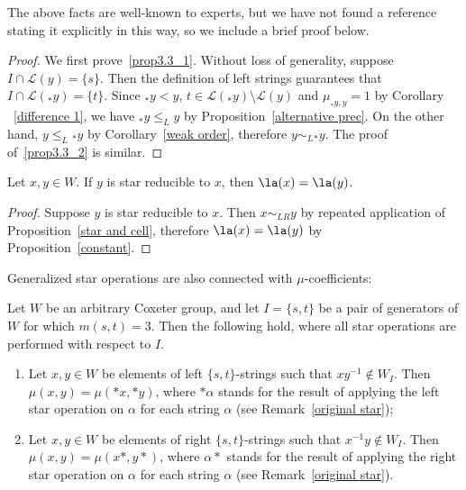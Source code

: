  \begin{rema}
 The above facts are well-known to experts, but we have
 not found a reference stating it explicitly in this way, so we include a
 brief proof below. 
 \end{rema}
 \begin{proof}
 We first prove~\eqref{prop3.3_1}. Without loss of generality, suppose $I\cap
 \mathcal{L}(y)=\{s\}$. Then the definition of left strings guarantees that
 $I\cap\mathcal{L}({}_*y)=\{t\}$. Since ${}_*y<y$, $t\in \mathcal{L}({}_*
 y)\setminus\mathcal{L}(y)$ and $\mu_{{}_*y,y}=1$ by Corollary
~\ref{difference 1}, we have ${}_* y\le_L y$ by Proposition~\ref{alternative
 prec}. On the other hand, $y\le_L {}_* y$ by Corollary~\ref{weak order},
 therefore $y\sim_L {}_* y$. The proof of~\eqref{prop3.3_2} is similar.
 \end{proof} 

 \begin{coro}
 \label{star a}
 Let $x,y\in W$. If $y$ is star reducible to $x$, then $\la(x)=\la(y)$.
 \end{coro}
 \begin{proof}
 Suppose $y$ is star reducible to $x$. Then $x\sim_{LR} y$ by repeated
 application of Proposition~\ref{star and cell}, therefore
 $\la(x)=\la(y)$ by Proposition~\ref{constant}.
 \end{proof}

 Generalized star operations are also connected with $\mu$-coefficients:

 \begin{prop}[{\cite[Theorem 4.2]{KL}}]
 \label{star and mu}
 Let $W$ be an arbitrary Coxeter group, and let $I=\{s,t\}$ be a pair of
 generators of $W$ for which $m(s,t)=3$. Then the following hold, where all
 star operations are performed with respect to $I$.
 \begin{enumerate}
 \item Let $x,y\in W$ be elements of left $\{s,t\}$-strings such that
 $xy^{-1}\notin W_I$. Then $\mu(x,y)=\mu(*x,*y)$, where $*\alpha$ stands for the
 result of applying the left star operation on $\alpha$ for each string
 $\alpha$ \textup{(}see Remark~\ref{original star}\textup{)};
 \item Let $x,y\in W$ be elements of right $\{s,t\}$-strings such that
 $x^{-1}y\notin W_I$. Then $\mu(x,y)=\mu(x*,y*)$, where $\alpha*$ stands for the
 result of applying the right star operation on $\alpha$ for each string
 $\alpha$ \textup{(}see Remark~\ref{original star}\textup{)}.
 \end{enumerate}

 \end{prop}

